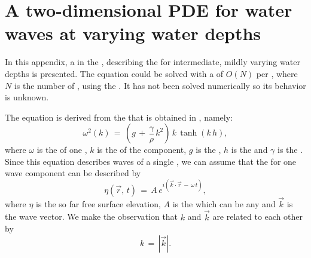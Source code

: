 \chapter{A two-dimensional PDE for water waves at varying water depths}
\label{apdx:pde_derivation}

In this appendix, a   \PDE in the , describing the  for intermediate, mildly varying water depths is presented. The equation could be solved with a  of $O(N)$ per , where $N$ is the number of , using the \CFMM \citep{White1994}. It has not been solved numerically so its behavior is unknown.

The equation is derived from the  that is obtained in , namely:
%
\begin{equation} \label{eq:dispersion_again}
\omega^2(k) \,=\, \left(g\,+\,\frac{\gamma}{\rho}\,k^2\right)\,k\,\tanh(k\,h),
\end{equation}
%
where $\omega$ is the  of one , $k$ is the  of the component, $g$ is the , $h$ is the  and $\gamma$ is the . Since this equation describes waves of a single , we can assume that the  for one wave component can be described by
%
\begin{equation} \label{eq:component}
\eta(\vec{r},\,t) \,=\, A\,e^{i(\vec{k}\cdot\vec{r}\,-\,\omega\,t)},
\end{equation}
%
where $\eta$ is the so far  free surface elevation, $A$ is the  which can be any  and $\vec{k}$ is the wave vector. We make the observation that $k$ and $\vec{k}$ are related to each other by
%
\begin{equation} \label{eq:kvectok}
k \,=\, \left|\vec{k}\right|.
\end{equation}

